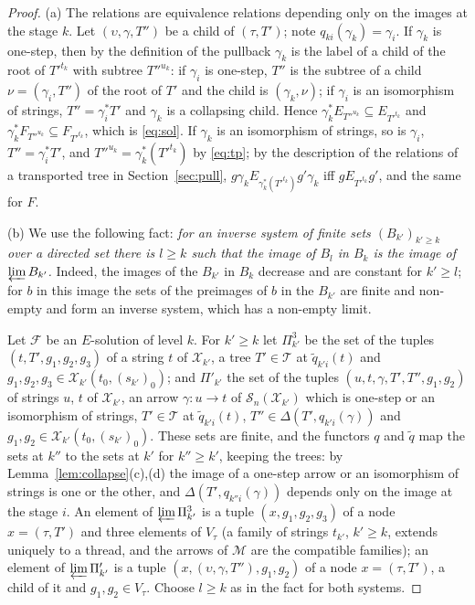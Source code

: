\documentclass[11pt]{amsart}
\theoremstyle{definition}
\newcommand{\cX}{\mathcal X}
\newcommand{\cM}{\mathcal M}
\newcommand{\cS}{\mathcal S}
\begin{document}
\begin{proof}
(a) The relations are equivalence relations depending only on the
images at the stage $k$. Let $(\upsilon,\gamma,T'')$ be a child of
$(\tau,T')$; note $q_{ki}(\gamma_k)=\gamma_i$. If $\gamma_k$ is
one-step, then by the definition of the pullback $\gamma_k$ is the
label of a child of the root of $T'^{t_k}$ with subtree $T''^{u_k}$:
if $\gamma_i$ is one-step, $T''$ is the subtree of a child
$\nu=(\gamma_i,T'')$ of the root of $T'$ and the child is
$(\gamma_k,\nu)$; if $\gamma_i$ is an isomorphism of strings,
$T''=\gamma_i^*T'$ and $\gamma_k$ is a collapsing child. Hence
$\gamma_k^*E_{T''^{u_k}}\subseteq E_{T'^{t_k}}$ and
$\gamma_k^*F_{T''^{u_k}}\subseteq F_{T'^{t_k}}$, which is
\eqref{eq:sol}. If $\gamma_k$ is an isomorphism of strings, so is
$\gamma_i$, $T''=\gamma_i^*T'$, and $T''^{u_k}=\gamma_k^*(T'^{t_k})$
by \eqref{eq:tp}; by the description of the relations of a
transported tree in Section~\ref{sec:pull}, $g\gamma_k\mathrel{
E_{\gamma_k^*(T'^{t_k})}}g'\gamma_k$ iff $g\mathrel{E_{T'^{t_k}}}g'$,
and the same for $F$.

(b) We use the following fact: \emph{for an inverse system of finite
sets $(B_{k'})_{k'\ge k}$ over a directed set there is $l\ge k$ such
that the image of $B_l$ in $B_k$ is the image of $\varprojlim
B_{k'}$.} Indeed, the images of the $B_{k'}$ in $B_k$ decrease and
are constant for $k'\ge l$; for $b$ in this image the sets of the
preimages of $b$ in the $B_{k'}$ are finite and non-empty and form an
inverse system, which has a non-empty limit.

Let $\mathcal F$ be an $E$-solution of level $k$. For $k'\ge k$ let
$\Pi^3_{k'}$ be the set of the tuples $(t,T',g_1,g_2,g_3)$ of a
string $t$ of $\cX_{k'}$, a tree $T'\in\mathcal T$ at $\tilde q_{k'i}
(t)$ and $g_1,g_2,g_3\in\cX_{k'}(t_0,(s_{k'})_0)$; and $\Pi'_{k'}$
the set of the tuples $(u,t,\gamma,T',T'',g_1,g_2)$ of strings $u$,
$t$ of $\cX_{k'}$, an arrow $\gamma\colon u\to t$ of $\cS_n(\cX_{k'})$
which is one-step or an isomorphism of strings, $T'\in\mathcal T$ at
$\tilde q_{k'i}(t)$, $T''\in\Delta(T',q_{k'i}(\gamma))$ and
$g_1,g_2\in\cX_{k'}(t_0,(s_{k'})_0)$. These sets are finite, and the
functors $q$ and $\tilde q$ map the sets at $k''$ to the sets at $k'$
for $k''\ge k'$, keeping the trees: by Lemma~\ref{lem:collapse}(c),(d)
the image of a one-step arrow or an isomorphism of strings is one or
the other, and $\Delta(T',q_{k''i}(\gamma))$ depends only on the image
at the stage $i$. An element of $\varprojlim\Pi^3_{k'}$ is a tuple
$(x,g_1,g_2,g_3)$ of a node $x=(\tau,T')$ and three elements of
$V_\tau$ (a family of strings $t_{k'}$, $k'\ge k$, extends uniquely
to a thread, and the arrows of $\cM$ are the compatible families); an
element of $\varprojlim\Pi'_{k'}$ is a tuple $(x,(\upsilon,\gamma,
T''),g_1,g_2)$ of a node $x=(\tau,T')$, a child of it and
$g_1,g_2\in V_\tau$. Choose $l\ge k$ as in the fact for both systems.


\end{proof}
\end{document}
